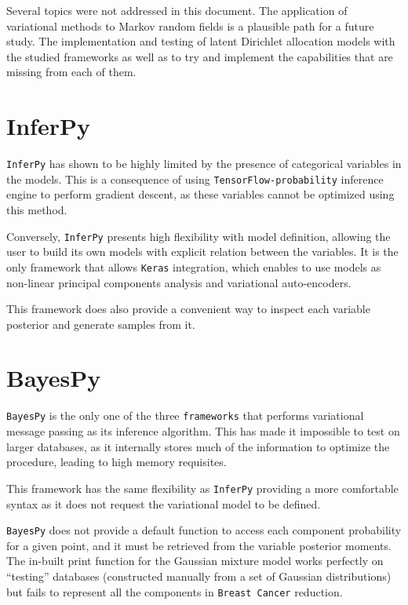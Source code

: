 Several topics were not addressed in this document. The application of variational methods to Markov random fields is a plausible path for a future study. The implementation and testing of latent Dirichlet allocation models with the studied frameworks as well as to try and implement the capabilities that are missing from each of them.

\section*{InferPy}
\texttt{InferPy} has shown to be highly limited by the presence of categorical variables in the models. This is a consequence of using \texttt{TensorFlow-probability} inference engine to perform gradient descent, as these variables cannot be optimized using this method.

Conversely, \texttt{InferPy} presents high flexibility with model definition, allowing the user to build its own models with explicit relation between the variables. It is the only framework that allows \texttt{Keras} integration, which enables to use models as non-linear principal components analysis and variational auto-encoders.

This framework does also provide a convenient way to inspect each variable posterior and generate samples from it.


\section*{BayesPy}

\texttt{BayesPy} is the only one of the three \texttt{frameworks} that performs variational message passing as its inference algorithm. This has made it impossible to test on larger databases, as it internally stores much of the information to optimize the procedure, leading to high memory requisites.

This framework has the same flexibility as \texttt{InferPy} providing a more comfortable syntax as it does not request the variational model to be defined.

\texttt{BayesPy} does not provide a default function to access each component probability for a given point, and it must be retrieved from the variable posterior moments. The in-built print function for the Gaussian mixture model works perfectly on ``testing'' databases (constructed manually from a set of Gaussian distributions) but fails to represent all the components in \texttt{Breast Cancer} reduction.

